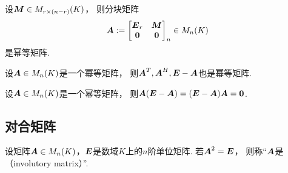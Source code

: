 \begin{example}
设\(\boldsymbol{M} \in M_{r \times (n-r)}(K)\)，
则分块矩阵\begin{equation*}
	\boldsymbol{A}
	:=
	\begin{bmatrix}
		\boldsymbol{E}_r & \boldsymbol{M} \\
		\boldsymbol0 & \boldsymbol0 \\
	\end{bmatrix}_n
	\in M_n(K)
\end{equation*}
是幂等矩阵.
\end{example}

\begin{property}
设\(\boldsymbol{A} \in M_n(K)\)是一个幂等矩阵，
则\(\boldsymbol{A}^T, \boldsymbol{A}^H, \boldsymbol{E} - \boldsymbol{A}\)也是幂等矩阵.
\end{property}

\begin{property}%
设\(\boldsymbol{A} \in M_n(K)\)是一个幂等矩阵，
则\(
	\boldsymbol{A} (\boldsymbol{E} - \boldsymbol{A})
	= (\boldsymbol{E} - \boldsymbol{A}) \boldsymbol{A}
	= \boldsymbol0
\).
\end{property}

\subsection{对合矩阵}
\begin{definition}
设矩阵\(\boldsymbol{A} \in M_n(K)\)，\(\boldsymbol{E}\)是数域\(K\)上的\(n\)阶单位矩阵.
若\(\boldsymbol{A}^2=\boldsymbol{E}\)，
则称“\(\boldsymbol{A}\)是（involutory matrix）”.
\end{definition}

